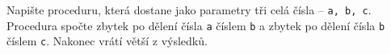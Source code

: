 \question[30]
Napište proceduru, která dostane jako parametry tři celá čísla -- \texttt{a, b,
c}. Procedura spočte zbytek po dělení čísla \texttt{a} číslem \texttt{b} a
zbytek po dělení čísla \texttt{b} číslem \texttt{c}. Nakonec vrátí větší z výsledků.